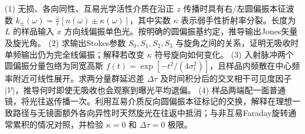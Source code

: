 (1) 无损、各向同性、互易光学活性介质在沿正 \(z\) 传播时具有右/左圆偏振本征波数 \(k_\pm(\omega)=\frac{\omega}{c}[n(\omega)\pm\kappa(\omega)]\)，其中实数 \(\kappa\) 表示弱手性折射率分裂。长度为 \(L\) 的样品输入 \(x\) 方向线偏振单色光。按明确的圆偏振基约定，推导输出Jones矢量及旋光角。
(2) 求输出Stokes参数 \(S_0,S_1,S_2,S_3\) 与旋角之间的关系，证明无吸收时单频输出仍为完全线偏振；解释若改变 \(\kappa\) 符号旋向如何变化。
(3) 入射脉冲两个圆偏振分量包络为同宽高斯 \(f(t)=\exp[-t^2/(4\sigma_t^2)]\)，且样品内频散在中心频率附近可线性展开。求两分量群延迟差 \(\Delta\tau\) 及时间积分后的交叉相干可见度因子 \(|\mathcal V|\)，推导何时即使无吸收也会观察到曝光平均退偏。
(4) 样品两端配一面普通镜，将光往返传播一次。利用互易介质反向圆偏振本征标记的交换，解释在理想一致路径与无镜面额外各向异性时天然旋光在往返中抵消；与非互易Faraday旋转通常累积的情况对照，并检验 \(\kappa=0\) 和 \(\Delta\tau=0\) 极限。
